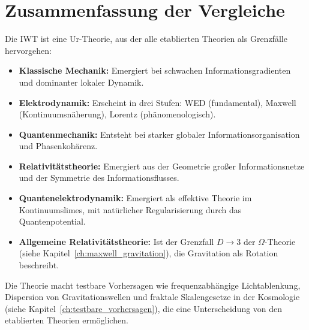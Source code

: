 \section{Zusammenfassung der Vergleiche}
\label{app:vergleich_zusammenfassung}

Die IWT ist eine Ur-Theorie, aus der alle etablierten Theorien als Grenzfälle hervorgehen:

\begin{itemize}
    \item \textbf{Klassische Mechanik:} Emergiert bei schwachen Informationsgradienten und dominanter lokaler Dynamik.
    \item \textbf{Elektrodynamik:} Erscheint in drei Stufen: WED (fundamental), Maxwell (Kontinuumsnäherung), Lorentz (phänomenologisch).
    \item \textbf{Quantenmechanik:} Entsteht bei starker globaler Informationsorganisation und Phasenkohärenz.
    \item \textbf{Relativitätstheorie:} Emergiert aus der Geometrie großer Informationsnetze und der Symmetrie des Informationsflusses.
    \item \textbf{Quantenelektrodynamik:} Emergiert als effektive Theorie im Kontinuumslimes, mit natürlicher Regularisierung durch das Quantenpotential.
    \item \textbf{Allgemeine Relativitätstheorie:} Ist der Grenzfall \( D \to 3 \) der \( \Omega \)-Theorie (siehe Kapitel~\ref{ch:maxwell_gravitation}), die Gravitation als Rotation beschreibt.
\end{itemize}

Die Theorie macht testbare Vorhersagen wie frequenzabhängige Lichtablenkung, Dispersion von Gravitationswellen und fraktale Skalengesetze in der Kosmologie (siehe Kapitel~\ref{ch:testbare_vorhersagen}), die eine Unterscheidung von den etablierten Theorien ermöglichen.